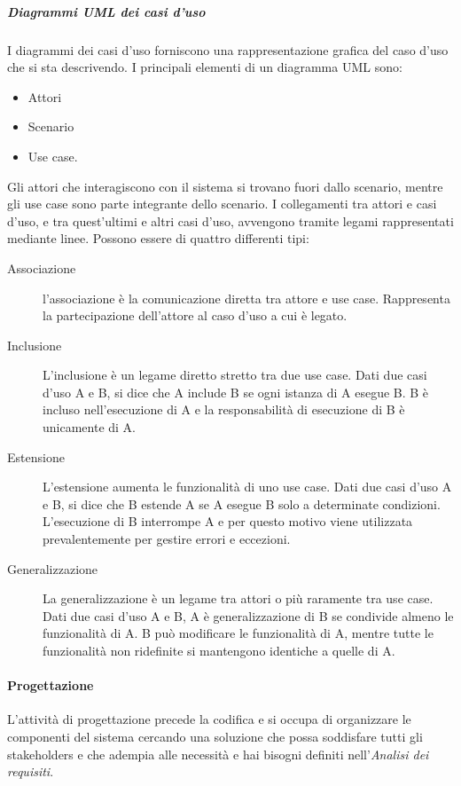 \documentclass[../../norme-di-progetto.tex]{subfiles}
\begin{document}
\subparagraph{Diagrammi UML dei casi d'uso}%
\label{subp:diagrammi_UML_dei_casi_d'uso}
I diagrammi dei casi d'uso forniscono una rappresentazione grafica del caso d'uso che si sta descrivendo. I principali elementi di un diagramma UML sono:
\begin{itemize}
  \item Attori
  \item Scenario
  \item Use case.
\end{itemize}
Gli attori che interagiscono con il sistema si trovano fuori dallo scenario, mentre gli use case sono parte integrante dello scenario.
I collegamenti tra attori e casi d'uso, e tra quest'ultimi e altri casi d'uso, avvengono tramite legami rappresentati mediante linee.
Possono essere di quattro differenti tipi:
\begin{description}
  \item [Associazione] l'associazione è la comunicazione diretta tra attore e use case. Rappresenta la partecipazione dell'attore al caso d'uso a cui è legato.
  \item [Inclusione] L'inclusione è un legame diretto stretto tra due use case. Dati due casi d'uso A e B, si dice che A include B se ogni istanza di A esegue B. B è incluso nell'esecuzione di A e la responsabilità di esecuzione di B è unicamente di A.
  \item [Estensione] L'estensione aumenta le funzionalità di uno use case. Dati due casi d'uso A e B, si dice che B estende A se A esegue B solo a determinate condizioni. L'esecuzione di B interrompe A e per questo motivo viene utilizzata prevalentemente per gestire errori e eccezioni.
  \item [Generalizzazione] La generalizzazione è un legame tra attori o più raramente tra use case. Dati due casi d'uso A e B, A è generalizzazione di B se condivide almeno le funzionalità di A. B può modificare le funzionalità di A, mentre tutte le funzionalità non ridefinite si mantengono identiche a quelle di A.
\end{description}

\paragraph{Progettazione}%
\label{par:progettazione}
L'attività di progettazione precede la codifica e si occupa di organizzare le componenti del sistema cercando una soluzione che possa soddisfare tutti gli stakeholders e che adempia alle necessità e hai bisogni definiti nell'\textit{Analisi dei requisiti}.
\end{document}
